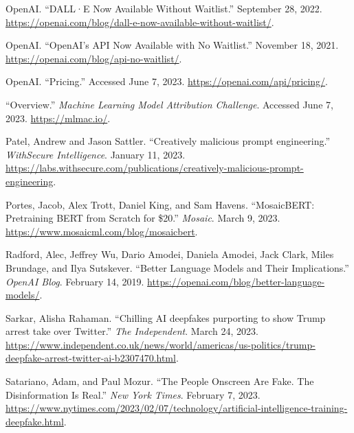 \documentclass{article}
\begin{document}
\begin{thebibliography}{9}
  OpenAI. ``DALL·E Now Available Without Waitlist.'' September 28, 2022. \href{https://openai.com/blog/dall-e-now-available-without-waitlist/}{https://openai.com/blog/dall-e-now-available-without-waitlist/}.

  OpenAI. ``OpenAI's API Now Available with No Waitlist.'' November 18, 2021. \href{https://openai.com/blog/api-no-waitlist/}{https://openai.com/blog/api-no-waitlist/}.

  OpenAI. ``Pricing.'' Accessed June 7, 2023. \href{https://openai.com/api/pricing/}{https://openai.com/api/pricing/}.

  ``Overview.'' \textit{Machine Learning Model Attribution Challenge}. Accessed June 7, 2023. \href{https://mlmac.io/}{https://mlmac.io/}. 

  Patel, Andrew and Jason Sattler. ``Creatively malicious prompt engineering.'' \textit{WithSecure Intelligence}. January 11, 2023. \href{https://labs.withsecure.com/publications/creatively-malicious-prompt-engineering}{https://labs.withsecure.com/publications/creatively-malicious-prompt-engineering}. 

  Portes, Jacob, Alex Trott, Daniel King, and Sam Havens. ``MosaicBERT: Pretraining BERT from Scratch for \$20.'' \textit{Mosaic}. March 9, 2023. \href{https://www.mosaicml.com/blog/mosaicbert}{https://www.mosaicml.com/blog/mosaicbert}. 

  Radford, Alec, Jeffrey Wu, Dario Amodei, Daniela Amodei, Jack Clark, Miles Brundage, and Ilya Sutskever. ``Better Language Models and Their Implications.'' \textit{OpenAI Blog}. February 14, 2019. \href{https://openai.com/blog/better-language-models/}{https://openai.com/blog/better-language-models/}.

  Sarkar, Alisha Rahaman. ``Chilling AI deepfakes purporting to show Trump arrest take over Twitter.'' \textit{The Independent}. March 24, 2023. \href{https://www.independent.co.uk/news/world/americas/us-politics/trump-deepfake-arrest-twitter-ai-b2307470.html}{https://www.independent.co.uk/news/world/americas/us-politics/trump-deepfake-arrest-twitter-ai-b2307470.html}. 

  Satariano, Adam, and Paul Mozur. ``The People Onscreen Are Fake. The Disinformation Is Real.'' \textit{New York Times}. February 7, 2023. \href{https://www.nytimes.com/2023/02/07/technology/artificial-intelligence-training-deepfake.html}{https://www.nytimes.com/2023/02/07/technology/artificial-intelligence-training-deepfake.html}. 


\end{thebibliography}
\end{document}
